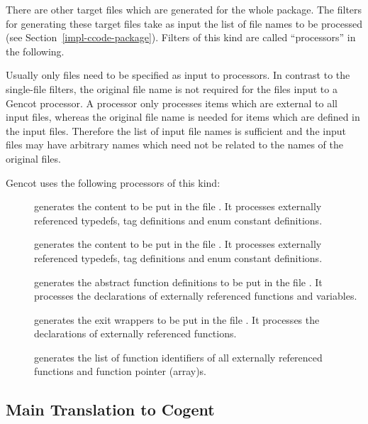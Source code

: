There are other target files which are generated for the whole package. The filters for generating these target files 
take as input the list of file names to be processed (see Section~\ref{impl-ccode-package}). Filters of this kind 
are called ``processors'' in the following. 

Usually only  files need to be specified as input to processors.
In contrast to the single-file filters, the original file name is not required for the files input to a 
Gencot processor. A processor only processes items which are external to all input files, whereas the original
file name is needed for items which are defined in the input files. Therefore the list of input file names is
sufficient and the input files may have arbitrary names which need not be related to the names of the original 
 files.

Gencot uses the following processors of this kind:
\begin{description}
\item[] generates the content to be put in the file . It 
processes externally referenced typedefs, tag definitions and enum constant definitions.
\item[] generates the content to be put in the file . It 
processes externally referenced typedefs, tag definitions and enum constant definitions.
\item[] generates the abstract function definitions to be put in the file 
. It processes the declarations of externally referenced functions and variables.
\item[] generates the exit wrappers to be put in the file . It processes
the declarations of externally referenced functions.
\item[] generates the list of function identifiers of all externally referenced functions and
function pointer (array)s.
\end{description}

\subsection{Main Translation to Cogent}
\label{impl-ccomps-main}

